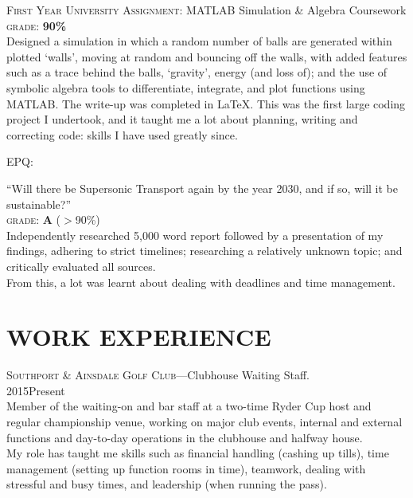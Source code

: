 \documentclass[9pt,a4paper]{article}
\begin{document}
{\noindent\textsc{First Year University Assignment:} MATLAB Simulation \& Algebra Coursework\\
\hangindent=0.7cm \textsc{grade: }\textbf{90\%}\\
Designed a simulation in which a random number of balls are generated within plotted `walls', moving at random and bouncing off the walls, with added features such as a trace behind the balls, `gravity', energy (and loss of); and the use of symbolic algebra tools to differentiate, integrate, and plot functions using MATLAB. The write-up was completed in \LaTeX. This was the first large coding project I undertook, and it taught me a lot about planning, writing and correcting code: skills I have used greatly since. \vspace{3mm}

\noindent\textsc{EPQ:} {``Will there be Supersonic Transport again by the year 2030, and if so, will it be sustainable?''\\
\hangindent=0.7cm\textsc{grade: }\textbf{A} ($>$90\%)\\Independently researched 5,000 word report followed by a presentation of my findings, adhering to strict timelines; researching a relatively unknown topic; and critically evaluated all sources.\\From this, a lot was learnt about dealing with deadlines and time management.

\section{WORK EXPERIENCE}
\noindent\textsc{Southport \& Ainsdale Golf Club}---Clubhouse Waiting Staff.\\
\hangindent=0.7cm 2015\textemdash Present\\Member of the waiting-on and bar staff at a two-time Ryder Cup host and regular championship venue, working on major club events, internal and external functions and day-to-day operations in the clubhouse and halfway house.\\My role has taught me skills such as financial handling (cashing up tills), time management (setting up function rooms in time), teamwork, dealing with stressful and busy times, and leadership (when running the pass). 
}}
\end{document}
